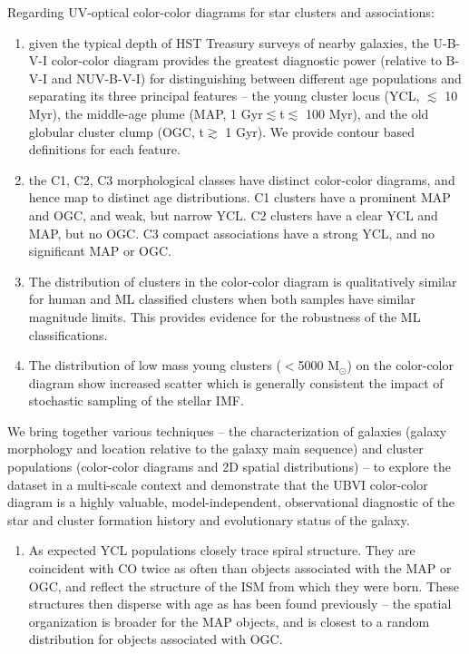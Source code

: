 \documentclass[linenumbers]{aastex63}
\begin{document}
{Regarding UV-optical color-color diagrams for star clusters and associations:
\begin{enumerate}  
\item given the typical depth of HST Treasury surveys of nearby galaxies, the U-B-V-I color-color diagram provides the greatest diagnostic power (relative to B-V-I and NUV-B-V-I) for distinguishing between different age populations and separating its three principal features --  the young cluster locus (YCL, $\lesssim$ 10 Myr), the middle-age plume (MAP, 1 Gyr$\lesssim$t$\lesssim$ 100 Myr), and the old globular cluster clump (OGC, t$\gtrsim$ 1 Gyr).  We provide contour based definitions for each feature.
\item the C1, C2, C3 morphological classes have distinct color-color diagrams, and hence map to distinct age distributions.  C1 clusters have a prominent MAP and OGC, and weak, but narrow YCL.  C2 clusters have a clear YCL and MAP, but no OGC.  C3 compact associations have a strong YCL, and no significant MAP or OGC.
\item  The distribution of clusters in the color-color diagram is qualitatively similar for human and ML classified clusters when both samples have similar magnitude limits.  This provides evidence for the robustness of the ML classifications.
\item The distribution of low mass young clusters ($<$5000 M$_\odot$) on the color-color diagram show increased scatter which is generally consistent the impact of stochastic sampling of the stellar IMF.
\end{enumerate}

We bring together various techniques -- the characterization of galaxies (galaxy morphology and location relative to the galaxy main sequence) and cluster populations (color-color diagrams and 2D spatial distributions) -- to explore the dataset in a multi-scale context and demonstrate that the UBVI color-color diagram is a highly valuable, model-independent, observational diagnostic of the star and cluster formation history and evolutionary status of the galaxy.
\begin{enumerate}
\item As expected YCL populations closely trace spiral structure.  They are coincident with CO twice as often than objects associated with the MAP or OGC, and reflect the structure of the ISM from which they were born. These structures then disperse with age as has been found previously -- the spatial organization is broader for the MAP objects, and is closest to a random distribution for objects associated with OGC.


\end{enumerate}}
\end{document}
